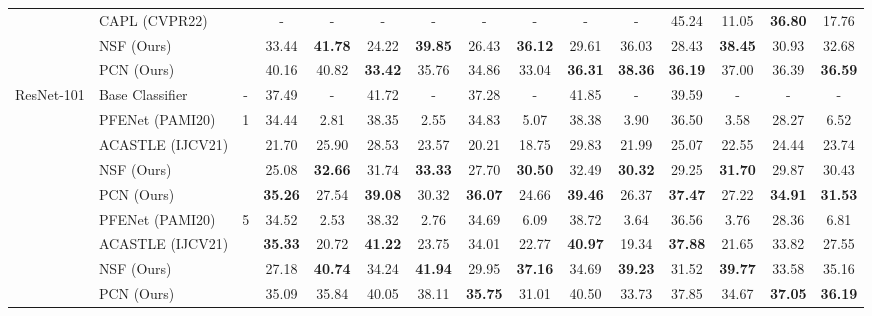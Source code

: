 \documentclass[journal]{IEEEtran}
\begin{document}
\begin{table*}[ht]
\begin{adjustbox}{max width=\textwidth}
\begin{tabular}{l|l|c|cccccccc|cccc}
         & CAPL (CVPR22) & & - & - & - & - & - & - & - & - &  45.24 & 11.05 & \textbf{36.80} & 17.76 \\
         & NSF (Ours) & & 33.44 & \textbf{41.78} & 24.22 & \textbf{39.85} & 26.43 & \textbf{36.12} & 29.61 &	36.03 &	28.43 &	\textbf{38.45} & 30.93 & 32.68 \\
         & PCN (Ours) & & 40.16 & 40.82 & \textbf{33.42} & 35.76 & 34.86 & 33.04 & \textbf{36.31} & \textbf{38.36} & \textbf{36.19} & 37.00 & 36.39 & \textbf{36.59} \\
         \hline
         \multirow{9}{*}{ResNet-101} & Base Classifier & - & 37.49 & - & 41.72 & - & 37.28 & - &	41.85 & - &	39.59 & - & - & - \\
         \cline{3-15}
         & PFENet (PAMI20) & \multirow{4}{*}{1} & 34.44 & 2.81 & 38.35 & 2.55 & 34.83 & 5.07 & 38.38 & 3.90 & 36.50 & 3.58 & 28.27 & 6.52\\
         & ACASTLE (IJCV21) & & 21.70 & 25.90 & 28.53 & 23.57 & 20.21 & 18.75 & 29.83 & 21.99 & 25.07 & 22.55 & 24.44 & 23.74 \\
         & NSF (Ours) & & 25.08 & \textbf{32.66} & 31.74 & \textbf{33.33} & 27.70 & \textbf{30.50} & 32.49 & \textbf{30.32} & 29.25 & \textbf{31.70} & 29.87 & 30.43 \\
         & PCN (Ours) & & \textbf{35.26} & 27.54 & \textbf{39.08} & 30.32 & \textbf{36.07} & 24.66 & \textbf{39.46} & 26.37 & \textbf{37.47} & 27.22 & \textbf{34.91} & \textbf{31.53} \\
         \cline{2-15}
         & PFENet (PAMI20) & \multirow{4}{*}{5} & 34.52 & 2.53 & 38.32 & 2.76 & 34.69 & 6.09 & 38.72 & 3.64 & 36.56 & 3.76 & 28.36 & 6.81 \\
         & ACASTLE (IJCV21) & & \textbf{35.33} & 20.72 & \textbf{41.22} & 23.75 & 34.01 & 22.77 & \textbf{40.97} & 19.34 & \textbf{37.88} & 21.65 & 33.82 & 27.55 \\
         & NSF (Ours) & & 27.18 & \textbf{40.74} & 34.24 & \textbf{41.94} & 29.95 & \textbf{37.16} & 34.69 & \textbf{39.23} & 31.52 & \textbf{39.77} & 33.58 & 35.16 \\
         & PCN (Ours) & & 35.09 & 35.84 & 40.05 & 38.11 & \textbf{35.75} & 31.01 & 40.50 & 33.73 & 37.85 & 34.67 & \textbf{37.05} & \textbf{36.19} \\
         \hline
    \end{tabular}
    \end{adjustbox}
    \label{tab:coco_main}
\end{table*}
\end{document}
